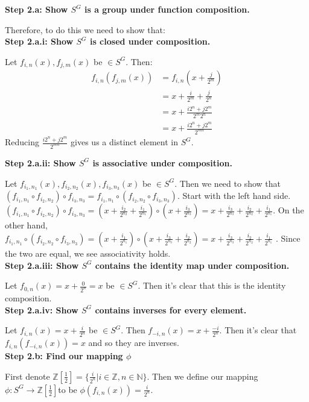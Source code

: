 \documentclass[12pt]{article}%
\newcommand{\N}{\mathbb{N}}
\newcommand{\Z}{\mathbb{Z}}
\begin{document}
\textbf{Step 2.a: Show $S^G$ is a group under function composition.}

Therefore, to do this we need to show that: \\

\textbf{Step 2.a.i: Show $S^G$ is closed under composition.}

Let $f_{i,n}(x), f_{j,m}(x)$ be $\in S^G$. Then: 
\begin{align*}
f_{i,n}(f_{j,m}(x))
&=f_{i,n}(x+\frac{j}{2^{m}}) \\
&=x+\frac{i}{2^{m}}+\frac{j}{2^{n}} \\
&=x+\frac{i2^{n}+j2^{m}}{2^{m}2^{n}} \\
&=x+\frac{i2^{n}+j2^{m}}{2^{mn}}
\end{align*}
Reducing $\frac{i2^{n}+j2^{m}}{2^{mn}}$ gives us a distinct element in $S^G$.

\textbf{Step 2.a.ii: Show $S^G$ is associative under composition.}

Let $f_{i_1,n_1}(x), f_{i_2,n_2}(x), f_{i_3,n_3}(x)$ be $\in S^G$. Then we need to show that
$(f_{i_1,n_1}\circ f_{i_2,n_2}) \circ f_{i_3,n_3}=f_{i_1,n_1}\circ (f_{i_2,n_2} \circ f_{i_3,n_3})$.
Start with the left hand side.
$(f_{i_1,n_1}\circ f_{i_2,n_2}) \circ f_{i_3,n_3} = (x+\frac{i_2}{2^{n_2}}+\frac{i_1}{2^{n_1}}) \circ (x+\frac{i_3}{2^{n_3}}) = x+\frac{i_3}{2^{n_3}}+\frac{i_2}{2^{n_2}}+\frac{i_1}{2^{n_1}}$. On the other
hand, $f_{i_1,n_1}\circ (f_{i_2,n_2} \circ f_{i_3,n_3})=(x+\frac{i_1}{2^{n_1}})\circ (x+\frac{i_3}{2^{n_3}}+\frac{i_2}{2^{n_2}})=x+\frac{i_3}{2^{n_3}}+\frac{i_2}{2^{n_2}}+\frac{i_1}{2^{n_1}}$
. Since the two are equal, we see associativity holds. \\

\textbf{Step 2.a.iii: Show $S^G$ contains the identity map under composition.}

Let $f_{0,n}(x)=x+\frac{0}{2^n}=x$ be $\in S^G$.  Then it's clear that this is the identity composition. \\

\textbf{Step 2.a.iv: Show $S^G$ contains inverses for every element.}

Let $f_{i,n}(x)=x+\frac{i}{2^n}$ be $\in S^G$.  Then $f_{-i,n}(x)=x+\frac{-i}{2^n}$. Then it's clear that
$f_{i,n}(f_{-i,n}(x))=x$ and so they are inverses. \\

\textbf{Step 2.b: Find our mapping $\phi$}

First denote $\Z\left[\frac{1}{2}\right]=\{ \frac{i}{2^n} | i \in \Z, n \in \N \}$. Then we define our
mapping $\phi:S^G \rightarrow \Z\left[\frac{1}{2}\right]$to be $\phi(f_{i,n}(x))=\frac{i}{2^n}$. \\
\end{document}
